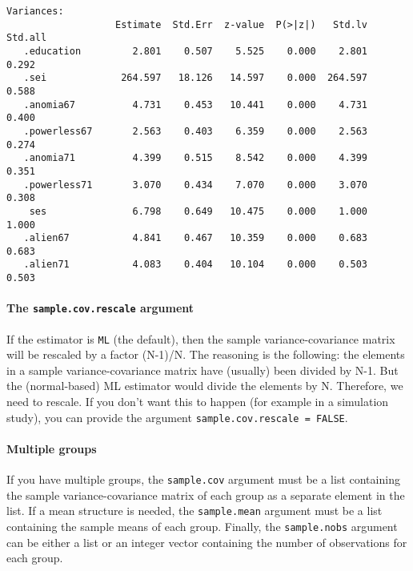 \begin{verbatim}
Variances:
                   Estimate  Std.Err  z-value  P(>|z|)   Std.lv  Std.all
   .education         2.801    0.507    5.525    0.000    2.801    0.292
   .sei             264.597   18.126   14.597    0.000  264.597    0.588
   .anomia67          4.731    0.453   10.441    0.000    4.731    0.400
   .powerless67       2.563    0.403    6.359    0.000    2.563    0.274
   .anomia71          4.399    0.515    8.542    0.000    4.399    0.351
   .powerless71       3.070    0.434    7.070    0.000    3.070    0.308
    ses               6.798    0.649   10.475    0.000    1.000    1.000
   .alien67           4.841    0.467   10.359    0.000    0.683    0.683
   .alien71           4.083    0.404   10.104    0.000    0.503    0.503
\end{verbatim}

\hypertarget{the-sample.cov.rescale-argument}{%
\paragraph{\texorpdfstring{The \texttt{sample.cov.rescale}
argument}{The sample.cov.rescale argument}}\label{the-sample.cov.rescale-argument}}

If the estimator is \texttt{ML} (the default), then the sample
variance-covariance matrix will be rescaled by a factor (N-1)/N. The
reasoning is the following: the elements in a sample variance-covariance
matrix have (usually) been divided by N-1. But the (normal-based) ML
estimator would divide the elements by N. Therefore, we need to rescale.
If you don't want this to happen (for example in a simulation study),
you can provide the argument \texttt{sample.cov.rescale\ =\ FALSE}.

\hypertarget{multiple-groups}{%
\paragraph{Multiple groups}\label{multiple-groups}}

If you have multiple groups, the \texttt{sample.cov} argument must be a
list containing the sample variance-covariance matrix of each group as a
separate element in the list. If a mean structure is needed, the
\texttt{sample.mean} argument must be a list containing the sample means
of each group. Finally, the \texttt{sample.nobs} argument can be either
a list or an integer vector containing the number of observations for
each group.
